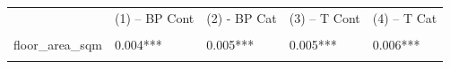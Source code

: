 \documentclass[]{book}
\begin{document}
\begin{longtable}[]{@{}lllll@{}}
\begin{minipage}[t]{0.15\columnwidth}
\strut
\end{minipage} & \begin{minipage}[t]{0.17\columnwidth}\raggedright\strut
(1) -- BP Cont\strut
\end{minipage} & \begin{minipage}[t]{0.17\columnwidth}\raggedright\strut
(2) - BP Cat\strut
\end{minipage} & \begin{minipage}[t]{0.18\columnwidth}\raggedright\strut
(3) -- T Cont\strut
\end{minipage} & \begin{minipage}[t]{0.18\columnwidth}\raggedright\strut
(4) -- T Cat\strut
\end{minipage}\tabularnewline
\begin{minipage}[t]{0.15\columnwidth}\raggedright\strut
\strut
\end{minipage} & \begin{minipage}[t]{0.17\columnwidth}\raggedright\strut
\strut
\end{minipage} & \begin{minipage}[t]{0.17\columnwidth}\raggedright\strut
\strut
\end{minipage} & \begin{minipage}[t]{0.18\columnwidth}\raggedright\strut
\strut
\end{minipage} & \begin{minipage}[t]{0.18\columnwidth}\raggedright\strut
\strut
\end{minipage}\tabularnewline
\begin{minipage}[t]{0.15\columnwidth}\raggedright\strut
floor\_area\_sqm\strut
\end{minipage} & \begin{minipage}[t]{0.17\columnwidth}\raggedright\strut
0.004***\strut
\end{minipage} & \begin{minipage}[t]{0.17\columnwidth}\raggedright\strut
0.005***\strut
\end{minipage} & \begin{minipage}[t]{0.18\columnwidth}\raggedright\strut
0.005***\strut
\end{minipage} & \begin{minipage}[t]{0.18\columnwidth}\raggedright\strut
0.006***\strut
\end{minipage}\tabularnewline
\begin{minipage}[t]{0.15\columnwidth}\raggedright\strut
\strut
\end{minipage} & \begin{minipage}[t]{0.17\columnwidth}\raggedright\strut

\end{minipage}
\end{longtable}
\end{document}
